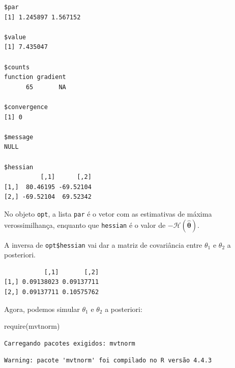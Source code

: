 \documentclass[
  letterpaper,
  DIV=11,
  numbers=noendperiod]{scrreprt}
\newenvironment{Shaded}{\begin{snugshade}}{\end{snugshade}}
\newcommand{\DecValTok}[1]{\textcolor[rgb]{0.68,0.00,0.00}{#1}}
\newcommand{\FunctionTok}[1]{\textcolor[rgb]{0.28,0.35,0.67}{#1}}
\newcommand{\NormalTok}[1]{\textcolor[rgb]{0.00,0.23,0.31}{#1}}
\newcommand{\OtherTok}[1]{\textcolor[rgb]{0.00,0.23,0.31}{#1}}
\newcommand{\SpecialCharTok}[1]{\textcolor[rgb]{0.37,0.37,0.37}{#1}}
\theoremstyle{plain}
\theoremstyle{definition}
\theoremstyle{definition}
\theoremstyle{remark}
\begin{document}
\begin{verbatim}
$par
[1] 1.245897 1.567152

$value
[1] 7.435047

$counts
function gradient 
      65       NA 

$convergence
[1] 0

$message
NULL

$hessian
          [,1]      [,2]
[1,]  80.46195 -69.52104
[2,] -69.52104  69.52342
\end{verbatim}

No objeto \texttt{opt}, a lista \texttt{par} é o vetor com as
estimativas de máxima verossimilhança, enquanto que \texttt{hessian} é o
valor de \(-\mathcal{H}(\hat{\boldsymbol{\theta}})\).

A inversa de \texttt{opt\$hessian} vai dar a matriz de covariância entre
\(\theta_1\) e \(\theta_2\) a posteriori.

\begin{Shaded}
\end{Shaded}

\begin{verbatim}
           [,1]       [,2]
[1,] 0.09138023 0.09137711
[2,] 0.09137711 0.10575762
\end{verbatim}

Agora, podemos simular \(\theta_1\) e \(\theta_2\) a posteriori:

\begin{Shaded}
\begin{Highlighting}[]
\FunctionTok{require}\NormalTok{(mvtnorm)}
\end{Highlighting}
\end{Shaded}

\begin{verbatim}
Carregando pacotes exigidos: mvtnorm
\end{verbatim}

\begin{verbatim}
Warning: pacote 'mvtnorm' foi compilado no R versão 4.4.3
\end{verbatim}

\begin{Shaded}
\end{Shaded}
\end{document}
